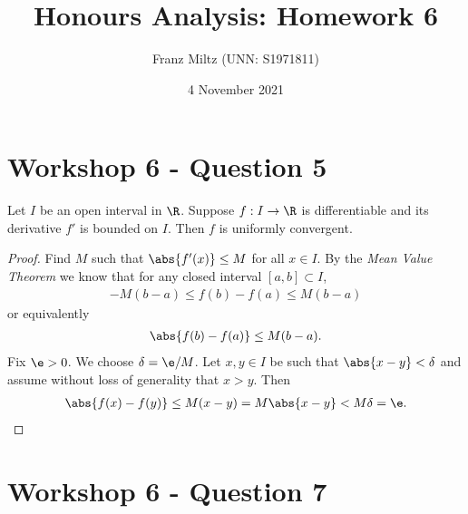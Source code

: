 \documentclass{article}
\begin{document}
\title{Honours Analysis: Homework 6}
\author{Franz Miltz (UNN: S1971811)}
\date{4 November 2021}
\maketitle

\section*{Workshop 6 - Question 5}
\begin{claim*}
   Let $I$ be an open interval in $\R$. Suppose $f:I\to\R$ is differentiable
   and its derivative $f'$ is bounded on $I$. Then $f$ is uniformly convergent.
\end{claim*}
\begin{proof}
   Find $M$ such that $\abs{f'(x)} \leq M$ for all $x\in I$. By the
   \emph{Mean Value Theorem} we know that for any closed interval $[a,b]\subset I$,
   \begin{align*}
      -M(b-a) \leq f(b) - f(a) \leq M(b-a)
   \end{align*}
   or equivalently
   \begin{align*}
      \abs{f(b)-f(a)} \leq M(b-a).
   \end{align*}
   Fix $\e>0$. We choose $\delta = \e/M$. Let $x,y\in I$ be such that $\abs{x-y}<\delta$
   and assume without loss of generality that $x>y$. Then
   \begin{align*}
      \abs{f(x) - f(y)} \leq M(x-y) = M\abs{x-y} < M\delta = \e.
   \end{align*}
\end{proof}

\section*{Workshop 6 - Question 7}
\end{document}
